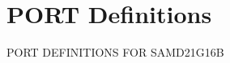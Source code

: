 \hypertarget{group___s_a_m_d21_g16_b__port}{}\section{P\+O\+RT Definitions}
\label{group___s_a_m_d21_g16_b__port}
P\+O\+RT D\+E\+F\+I\+N\+I\+T\+I\+O\+NS F\+OR S\+A\+M\+D21\+G16B 